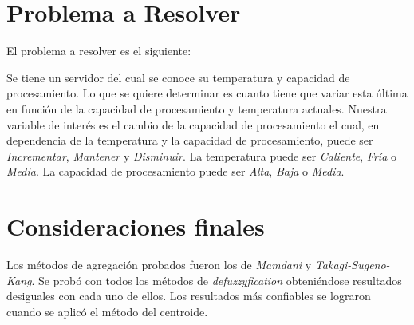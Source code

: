 \documentclass[12pt]{article}
\begin{document}
\section{Problema a Resolver}

El problema a resolver es el siguiente:

Se tiene un servidor del cual se conoce su temperatura y capacidad de procesamiento. Lo que se quiere determinar es cuanto tiene que variar esta \'ultima en funci\'on de la capacidad de procesamiento y temperatura actuales. Nuestra variable de inter\'es es el cambio de la capacidad de procesamiento el cual, en dependencia de la temperatura y la capacidad de procesamiento, puede ser \emph{Incrementar}, \emph{Mantener} y \emph{Disminuir}. La temperatura puede ser \emph{Caliente}, \emph{Fr\'ia} o \emph{Media}. La capacidad de procesamiento puede ser \emph{Alta}, \emph{Baja} o \emph{Media}.

\section{Consideraciones finales}

Los m\'etodos de agregaci\'on probados fueron los de \emph{Mamdani} y \emph{Takagi-Sugeno-Kang}. Se prob\'o con todos los m\'etodos de \emph{defuzzyfication} obteni\'endose resultados desiguales con cada uno de ellos. Los resultados m\'as confiables se lograron cuando se aplic\'o el m\'etodo del centroide.
\end{document}
